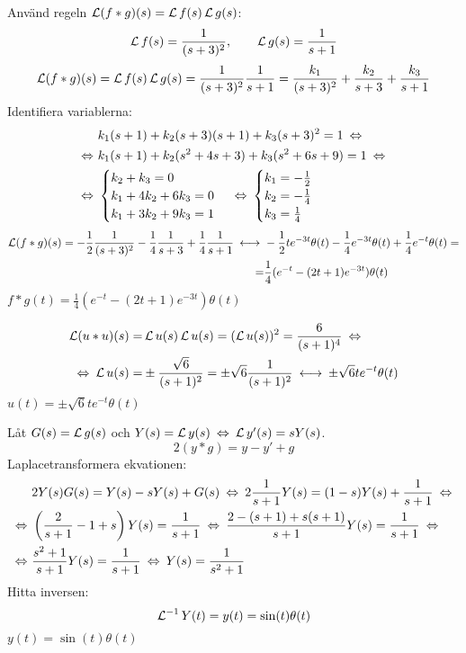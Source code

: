 \begin{task}{6.6}
	Använd regeln $\laplace (f*g)(s)=\laplace f(s)\*\laplace g(s)$:
	\[\operatorname{\mathcal{L}} f(s)=\frac{1}{(s+3)^2},\qquad
	\operatorname{\mathcal{L}} g(s)=\frac{1}{s+1}\]
	\begin{align*}
	\laplace(f*g)(s)=
	\laplace f(s)\*\laplace g(s)=
	\frac{1}{(s+3)^2}\*\frac{1}{s+1}=
	\frac{k_1}{(s+3)^2}+\frac{k_2}{s+3}+\frac{k_3}{s+1}
	\end{align*}
	Identifiera variablerna:
	\begin{align*}
	&k_1(s+1)+k_2(s+3)(s+1)+k_3(s+3)^2=1 \lra \\ \lra
	&k_1(s+1)+k_2(s^2+4s+3)+k_3(s^2+6s+9)=1 \lra \\ \lra
	&\begin{cases}
	k_2+k_3=0 \\
	k_1+4k_2+6k_3=0 \\
	k_1+3k_2+9k_3=1
	\end{cases} \lra
	\begin{cases}
	k_1=-\frac{1}{2} \\
	k_2=-\frac{1}{4} \\
	k_3=\frac{1}{4}
	\end{cases}
	\end{align*}
	\begin{align*}
	\laplace (f*g)(s)=
	-\frac{1}{2}\*\frac{1}{(s+3)^2}-\frac{1}{4}\*\frac{1}{s+3}+\frac{1}{4}\*\frac{1}{s+1} \llra
	&-\frac{1}{2}te^{-3t}\theta(t)-\frac{1}{4}e^{-3t}\theta(t)+\frac{1}{4}e^{-t}\theta(t)= \\ =
	&\frac{1}{4}(e^{-t}-(2t+1)e^{-3t})\theta(t)
	\end{align*}
	\ans $f*g(t)=\frac{1}{4}(e^{-t}-(2t+1)e^{-3t})\theta(t)$
\end{task}

\begin{task}{6.7}
	\begin{align*}
	\laplace (u*u)(s)=
	&\laplace u(s)\*\laplace u(s)=
	(\laplace u(s))^2=
	\frac{6}{(s+1)^4} \lra \\ \lra
	\laplace u(s)=
	&\pm\frac{\sqrt{6}}{(s+1)^2}=
	\pm\sqrt{6}\frac{1}{(s+1)^2}\llra
	\pm\sqrt{6}te^{-t}\theta(t)
	\end{align*}
	\ans $u(t)=\pm\sqrt{6}te^{-t}\theta(t)$
\end{task}

\begin{task}{6.8}
	Låt $G(s)=\operatorname{\mathcal{L}} g(s)$ och $Y(s)=\laplace y(s) \lra \laplace y'(s)=sY(s)$.
	\[2(y*g)=y-y'+g\]
	Laplacetransformera ekvationen:
	\begin{align*}
	&2Y(s)G(s)=Y(s)-sY(s)+G(s) \lra
	2\frac{1}{s+1}Y(s)=(1-s)Y(s)+\frac{1}{s+1} \lra \\ \lra
	&\left(\frac{2}{s+1}-1+s\right)Y(s)=\frac{1}{s+1} \lra
	\frac{2-(s+1)+s(s+1)}{s+1}Y(s)=\frac{1}{s+1} \lra \\ \lra
	&\frac{s^2+1}{s+1}Y(s)=\frac{1}{s+1} \lra
	Y(s)=\frac{1}{s^2+1}
	\end{align*}
	Hitta inversen:
	\begin{align*}
	\operatorname{\mathcal{L}}^{-1}Y(t)=y(t)=\sin(t)\theta(t)
	\end{align*}
	\ans $y(t)=\sin(t)\theta(t)$
\end{task}